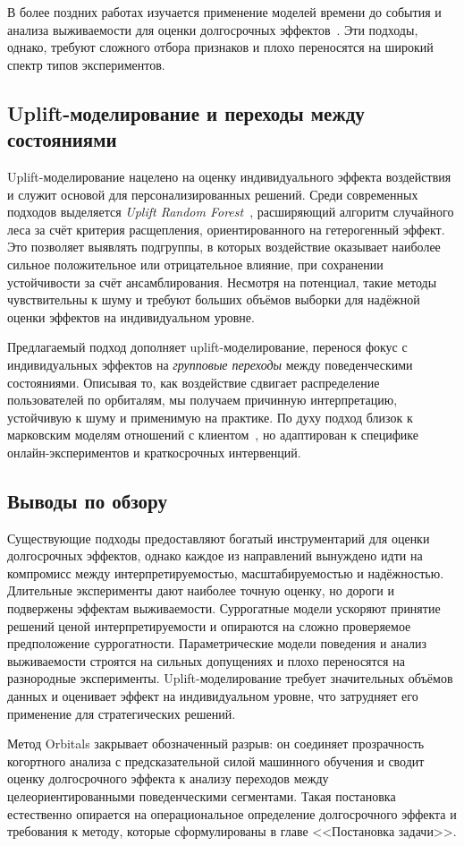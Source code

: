 В более поздних работах изучается применение моделей времени до события и
анализа выживаемости для оценки долгосрочных
эффектов~\cite{luck2019learning}. Эти подходы, однако, требуют сложного
отбора признаков и плохо переносятся на широкий спектр типов экспериментов.

\subsection*{Uplift-моделирование и переходы между состояниями}

Uplift-моделирование нацелено на оценку индивидуального эффекта воздействия
и служит основой для персонализированных решений. Среди современных
подходов выделяется \textit{Uplift Random Forest}~\cite{guelman2015uplift},
расширяющий алгоритм случайного леса за счёт критерия расщепления,
ориентированного на гетерогенный эффект. Это позволяет выявлять подгруппы,
в которых воздействие оказывает наиболее сильное положительное или
отрицательное влияние, при сохранении устойчивости за счёт ансамблирования.
Несмотря на потенциал, такие методы чувствительны к шуму и требуют больших
объёмов выборки для надёжной оценки эффектов на индивидуальном уровне.

Предлагаемый подход дополняет uplift-моделирование, перенося фокус с
индивидуальных эффектов на \textit{групповые переходы} между поведенческими
состояниями. Описывая то, как воздействие сдвигает распределение
пользователей по орбиталям, мы получаем причинную интерпретацию,
устойчивую к шуму и применимую на практике. По духу подход близок к
марковским моделям отношений с клиентом~\cite{pfeifer2003modeling,
netzer2008mm}, но адаптирован к специфике онлайн-экспериментов и
краткосрочных интервенций.

\subsection*{Выводы по обзору}

Существующие подходы предоставляют богатый инструментарий для оценки
долгосрочных эффектов, однако каждое из направлений вынуждено идти на
компромисс между интерпретируемостью, масштабируемостью и надёжностью.
Длительные эксперименты дают наиболее точную оценку, но дороги и подвержены
эффектам выживаемости. Суррогатные модели ускоряют принятие решений ценой
интерпретируемости и опираются на сложно проверяемое предположение
суррогатности. Параметрические модели поведения и анализ выживаемости
строятся на сильных допущениях и плохо переносятся на разнородные
эксперименты. Uplift-моделирование требует значительных объёмов данных и
оценивает эффект на индивидуальном уровне, что затрудняет его применение
для стратегических решений.

Метод Orbitals закрывает обозначенный разрыв: он соединяет прозрачность
когортного анализа с предсказательной силой машинного обучения и сводит
оценку долгосрочного эффекта к анализу переходов между целеориентированными
поведенческими сегментами. Такая постановка естественно опирается на
операциональное определение долгосрочного эффекта и требования к методу,
которые сформулированы в главе <<Постановка задачи>>.